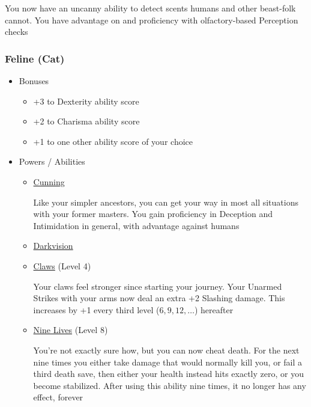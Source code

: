 \documentclass[12pt, landscape]{article}
\begin{document}
\begin{FlushLeft}
\begin{multicols}{2}
\begin{itemize}[wide]
\begin{itemize}
					You now have an uncanny ability to detect scents humans and other beast-folk cannot.
					You have advantage on and proficiency with olfactory-based Perception checks
				\end{itemize}
			\end{itemize}
			\vfill \null \columnbreak

			\subsubsection{Feline (Cat)}
			\begin{itemize}[wide]
				\item Bonuses
				\begin{itemize}
					\item +3 to Dexterity ability score
					\item +2 to Charisma ability score
					\item +1 to one other ability score of your choice
				\end{itemize}
				\item Powers / Abilities
				\begin{itemize}
					\item \underline{Cunning}

					Like your simpler ancestors, you can get your way in most all situations with your former masters.
					You gain proficiency in Deception and Intimidation in general, with advantage against humans
					\item \underline{Darkvision}
					\item \underline{Claws} (Level 4)

					Your claws feel stronger since starting your journey.
					Your Unarmed Strikes with your arms now deal an extra +2 Slashing damage.
					This increases by +1 every third level ($6, 9, 12, \dots$) hereafter

					\item \underline{Nine Lives} (Level 8)

					You’re not exactly sure how, but you can now cheat death.
					For the next nine times you either take damage that would normally kill you, or fail a third death save, then either your health instead hits exactly zero, or you become stabilized.
					After using this ability nine times, it no longer has any effect, forever
				\end{itemize}
			\end{itemize}
			\vfill \pagebreak


\end{multicols}
\end{FlushLeft}
\end{document}
